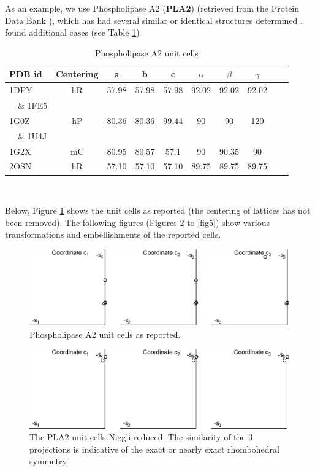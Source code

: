 \documentclass[]{iucr}              %
\numberwithin{equation}{section}
\begin{document}
	As an example, we use Phospholipase A2 (\textbf{PLA2}) (retrieved from 
	the Protein Data Bank \cite{Bernstein1977}), which has had several similar
	or identical structures determined \cite{LeTrong2007}. 
	found additional cases (see Table \ref{PLA2})
	
	
	\begin{table}
		\begin{tabular}{m{} c c c c c c c c c}
			\toprule
			PDB id & Centering & a&b&c&$\alpha$&$\beta$&$\gamma$\\
			\midrule
			1DPY & hR& 57.98& 57.98& 57.98& 92.02& 92.02& 92.02\\
			~~\& 1FE5 \\
			1G0Z  & hP& 80.36& 80.36& 99.44& 90&    90&    120\\
			~~\& 1U4J\\
			1G2X & mC& 80.95& 80.57& 57.1 & 90&    90.35&  90\\
			2OSN & hR& 57.10& 57.10& 57.10& 89.75& 89.75&  89.75\\
			\bottomrule
		\end{tabular}	\\
		\caption{Phospholipase A2 unit cells}
		\label{PLA2}
	\end{table}
	
	Below, Figure \ref{fig1} shows the unit cells as 
	reported (the centering of lattices has not been removed).
	The following figures (Figures \ref{fig2} to \ref{fig5}) show various transformations and
	embellishments of the reported cells.
	
	\begin{figure}
		\includegraphics[width=1.0\textwidth]{1_35}
		\caption{Phospholipase A2 unit cells as reported. }
		\label{fig1}
	\end{figure}
	
	\begin{figure}
		\includegraphics[width=1.0\textwidth]{2_06}
		\caption{The PLA2 unit cells Niggli-reduced. The similarity 
			of the 3 projections is indicative of the exact or nearly
			exact rhombohedral symmetry.}
		\label{fig2}
	\end{figure}
	
\end{document}
